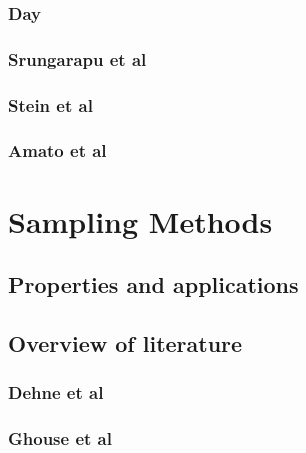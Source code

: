 \documentclass[10pt,a4paper,draft]{report}
\begin{document}
\subsubsection{Day}
\subsubsection{Srungarapu et al}
\subsubsection{Stein et al}



\subsubsection{Amato et al}



\section{Sampling Methods}
\subsection{Properties and applications}
\subsection{Overview of literature}
\subsubsection{Dehne et al}
\subsubsection{Ghouse et al}
\end{document}
